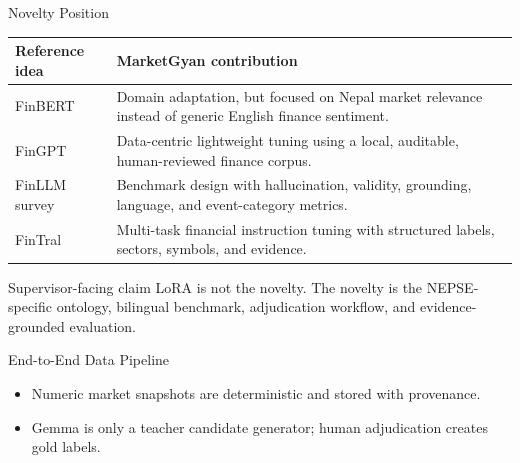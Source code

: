 \documentclass[aspectratio=169,11pt,hyperref={bookmarks=false}]{beamer}
\newcommand{\smallsep}{\vspace{0.35em}}
\begin{document}
\begin{frame}{Novelty Position}
  \small
  \begin{tabularx}{\textwidth}{@{}p{}X@{}}
    \toprule
    Reference idea & MarketGyan contribution \\
    \midrule
    FinBERT & Domain adaptation, but focused on Nepal market relevance instead of generic English finance sentiment. \\
    FinGPT & Data-centric lightweight tuning using a local, auditable, human-reviewed finance corpus. \\
    FinLLM survey & Benchmark design with hallucination, validity, grounding, language, and event-category metrics. \\
    FinTral & Multi-task financial instruction tuning with structured labels, sectors, symbols, and evidence. \\
    \bottomrule
  \end{tabularx}
  \smallsep
  \begin{block}{Supervisor-facing claim}
    LoRA is not the novelty. The novelty is the NEPSE-specific ontology, bilingual benchmark, adjudication workflow, and evidence-grounded evaluation.
  \end{block}
\end{frame}

\begin{frame}{End-to-End Data Pipeline}
  \centering
  \smallsep
  \begin{itemize}
    \item Numeric market snapshots are deterministic and stored with provenance.
    \item Gemma is only a teacher candidate generator; human adjudication creates gold labels.
  \end{itemize}
\end{frame}
\end{document}
